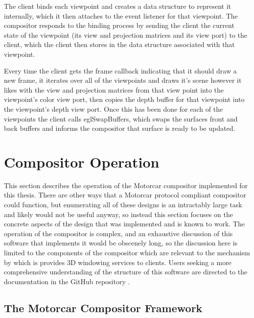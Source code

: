 The client binds each viewpoint and creates a data structure to represent it internally, which it then attaches to the event listener for that viewpoint. The compositor responds to the binding process by sending the client the current state of the viewpoint (its view and projection matrices and its view port) to the client, which the client then stores in the data structure associated with that viewpoint.

Every time the client gets the frame callback indicating that it should draw a new frame, it iterates over all of the viewpoints and draws it's scene however it likes with the view and projection matrices from that view point into the viewpoint's color view port, then copies the depth buffer for that viewpoint into the viewpoint's depth view port. Once this has been done for each of the viewpoints the client calls eglSwapBuffers, which swaps the surfaces front and back buffers and informs the compositor that surface is ready to be updated.

\section{Compositor Operation}

This section describes the operation of the Motorcar compositor implemented for this thesis. There are other ways that a Motorcar protocol compliant compositor could function, but enumerating all of these designs is an intractably large task and likely would not be useful anyway, so instead this section focuses on the concrete aspects of the design that was implemented and is known to work. The operation of the compositor is complex, and an exhaustive discussion of this software that implements it would be obscenely long, so the discussion here is limited to the components of the compositor which are relevant to the mechanism by which is provides 3D windowing services to clients. Users seeking a more comprehensive understanding of the structure of this software are directed to the documentation in the GitHub repository \cite{motorcar-github}.

\subsection{The Motorcar Compositor Framework}

